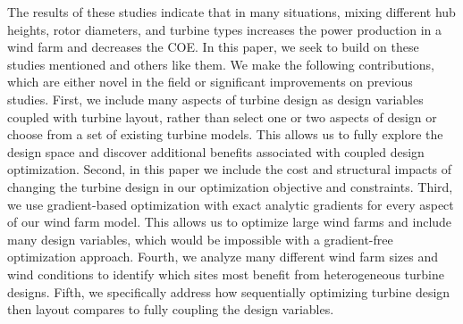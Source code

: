 The results of these studies indicate that in many situations, mixing different hub heights, rotor diameters, and turbine types increases the power production in a wind farm and decreases the COE. In this paper, we seek to build on these studies mentioned and others like them.
We make the following contributions, which are either novel in the field or significant improvements on previous studies.
First, we include many aspects of turbine design as design variables coupled with turbine layout, rather than select one or two aspects of design or choose from a set of existing turbine models. This allows us to fully explore the design space and discover additional benefits associated with coupled design optimization.
Second, in this paper we include the cost and structural impacts of changing the turbine design in our optimization objective and constraints.
Third, we use gradient-based optimization with exact analytic gradients for every aspect of our wind farm model. This allows us to optimize large wind farms and include many design variables, which would be impossible with a gradient-free optimization approach.
Fourth, we analyze many different wind farm sizes and wind conditions to identify which sites most benefit from heterogeneous turbine designs.
Fifth, we specifically address how sequentially optimizing turbine design then layout compares to fully coupling the design variables.



